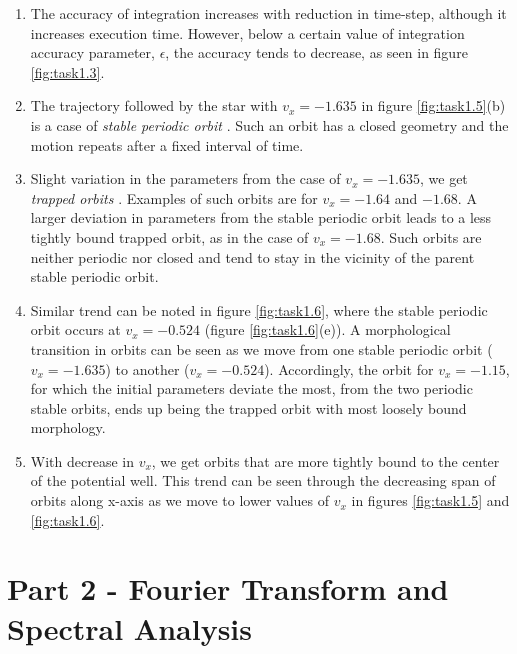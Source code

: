 \documentclass[a4paper]{article}
\begin{document}
		\begin{enumerate}
			
			\item The accuracy of integration increases with reduction in time-step, although it increases execution time. However, below a certain value of integration accuracy parameter, \(\epsilon\), the accuracy tends to decrease, as seen in figure \ref{fig:task1.3}.
			
			\item The trajectory followed by the star with \(v_x = -1.635\) in figure \ref{fig:task1.5}(b) is a case of \emph{stable periodic orbit} \cite{orbits_lamfr}. Such an orbit has a closed geometry and the motion repeats after a fixed interval of time.
			
			\item Slight variation in the parameters from the case of \(v_x = -1.635\), we get \emph{trapped orbits} \cite{orbits_lamfr}. Examples of such orbits are for \(v_x = -1.64\) and \(-1.68\). A larger deviation in parameters from the stable periodic orbit leads to a less tightly bound trapped orbit, as in the case of \(v_x = -1.68\). Such orbits are neither periodic nor closed and tend to stay in the vicinity of the parent stable periodic orbit.
			
			\item Similar trend can be noted in figure \ref{fig:task1.6}, where the stable periodic orbit occurs at \(v_x = -0.524\) (figure \ref{fig:task1.6}(e)). A morphological transition in orbits can be seen as we move from one stable periodic orbit (\(v_x = -1.635\)) to another (\(v_x = -0.524\)). Accordingly, the orbit for \(v_x = -1.15\), for which the initial parameters deviate the most, from the two periodic stable orbits, ends up being the trapped orbit with most loosely bound morphology.
			
			\item With decrease in \(v_x\), we get orbits that are more tightly bound to the center of the potential well. This trend can be seen through the decreasing span of orbits along x-axis as we move to lower values of \(v_x\) in figures \ref{fig:task1.5} and \ref{fig:task1.6}. 
			
		\end{enumerate}
		
	
	\clearpage
	\section{Part 2 - Fourier Transform and Spectral Analysis} \label{task2}
	
\end{document}
